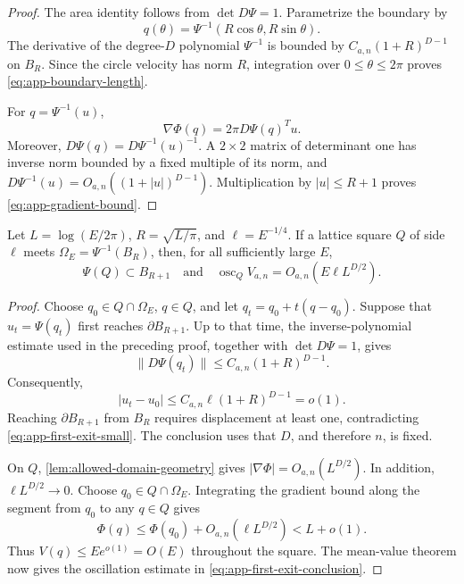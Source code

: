 \begin{proof}
The area identity follows from \(\det D\Psi=1\).  Parametrize the boundary
by
\begin{equation}
 q(\theta)=\Psi^{-1}(R\cos\theta,R\sin\theta).
\end{equation}
The derivative of the degree-\(D\) polynomial \(\Psi^{-1}\) is bounded by
\(C_{a,n}(1+R)^{D-1}\) on \(B_R\).  Since the circle velocity has norm
\(R\), integration over \(0\leq\theta\leq2\pi\) proves
\cref{eq:app-boundary-length}.

For \(q=\Psi^{-1}(u)\),
\begin{equation}
 \nabla\Phi(q)=2\pi D\Psi(q)^Tu.
 \label{eq:app-phi-chain}
\end{equation}
Moreover, \(D\Psi(q)=D\Psi^{-1}(u)^{-1}\).  A \(2\times2\) matrix of
determinant one has inverse norm bounded by a fixed multiple of its norm,
and \(D\Psi^{-1}(u)=O_{a,n}((1+|u|)^{D-1})\).  Multiplication by
\(|u|\leq R+1\) proves \cref{eq:app-gradient-bound}.
\end{proof}

\begin{lemma}
\label{lem:first-exit-control}
Let \(L=\log(E/2\pi)\), \(R=\sqrt{L/\pi}\), and
\(\ell=E^{-1/4}\).  If a lattice square \(Q\) of side \(\ell\) meets
\(\Omega_E=\Psi^{-1}(B_R)\), then, for all sufficiently large \(E\),
\begin{equation}
 \Psi(Q)\subset B_{R+1}
 \quad\text{and}\quad
 \operatorname{osc}_Q V_{a,n}
 =O_{a,n}(E\ell L^{D/2}).
 \label{eq:app-first-exit-conclusion}
\end{equation}
\end{lemma}

\begin{proof}
Choose \(q_0\in Q\cap\Omega_E\), \(q\in Q\), and let
\(q_t=q_0+t(q-q_0)\).  Suppose that
\(u_t=\Psi(q_t)\) first reaches \(\partial B_{R+1}\).  Up to that time,
the inverse-polynomial estimate used in the preceding proof, together with
\(\det D\Psi=1\), gives
\begin{equation}
 \|D\Psi(q_t)\|\leq C_{a,n}(1+R)^{D-1}.
\end{equation}
Consequently,
\begin{equation}
 |u_t-u_0|
 \leq C_{a,n}\ell(1+R)^{D-1}=o(1).
 \label{eq:app-first-exit-small}
\end{equation}
Reaching \(\partial B_{R+1}\) from \(B_R\) requires displacement at least
one, contradicting \cref{eq:app-first-exit-small}.  The conclusion uses that
\(D\), and therefore \(n\), is fixed.

On \(Q\), \cref{lem:allowed-domain-geometry} gives
\(|\nabla\Phi|=O_{a,n}(L^{D/2})\).  In addition,
\(\ell L^{D/2}\to0\).  Choose \(q_0\in Q\cap\Omega_E\).  Integrating the
gradient bound along the segment from \(q_0\) to any \(q\in Q\) gives
\[
 \Phi(q)\leq \Phi(q_0)+O_{a,n}(\ell L^{D/2})
 <L+o(1).
\]
Thus \(V(q)\leq E e^{o(1)}=O(E)\) throughout the square.  The mean-value
theorem now gives the oscillation estimate in
\cref{eq:app-first-exit-conclusion}.
\end{proof}

